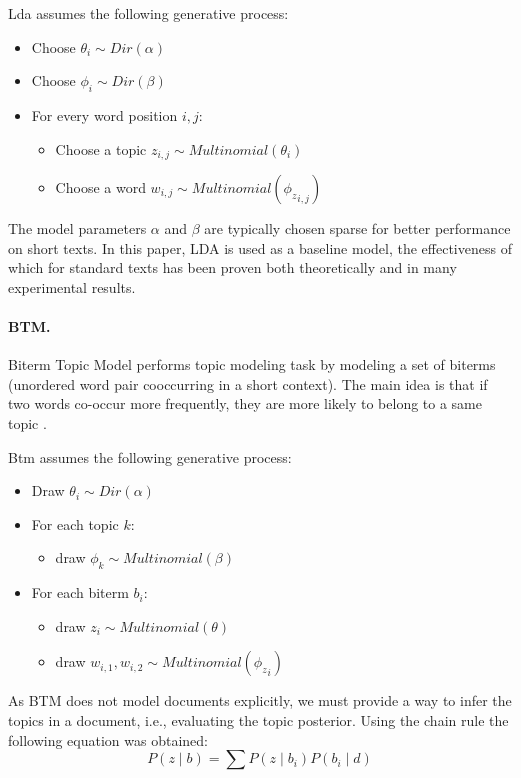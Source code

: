 Lda assumes the following generative process:
\begin{itemize}
	\item Choose \(\theta_i \sim \textit{Dir}(\alpha)\)
	\item Choose \(\phi_i \sim \textit{Dir}(\beta)\)
	\item For every word position \(i, j\):
	\begin{itemize}
		\item Choose a topic \(z_{i, j} \sim \textit{Multinomial}(\theta_i)\)
		\item Choose a word \(w_{i, j} \sim \textit{Multinomial}({\phi_z}_{i,j})\)
	\end{itemize}
\end{itemize}
The model parameters \(\alpha\) and \(\beta\) are typically chosen sparse for better performance on short texts. In this paper, LDA is used as a baseline model, the effectiveness of which for standard texts has been proven both theoretically and in many experimental results.

\paragraph{BTM.} Biterm Topic Model performs topic modeling task by modeling a set of biterms (unordered word pair cooccurring in a short context). The main idea is that if two words co-occur more frequently, they are more likely to belong to a same topic \cite{YanyanJiafengXueqi}.

Btm assumes the following generative process:
\begin{itemize}
	\item Draw \(\theta_i \sim \textit{Dir}(\alpha)\)
	\item For each topic \(k\):
	\begin{itemize}
		\item draw \(\phi_k \sim \textit{Multinomial}(\beta)\)
	\end{itemize}
	\item For each biterm \(b_i\):
	\begin{itemize}
		\item draw \(z_i \sim \textit{Multinomial}(\theta)\)
		\item draw \(w_{i,1},w_{i,2} \sim \textit{Multinomial}({\phi_z}_i)\)
	\end{itemize}
\end{itemize}

As BTM does not model documents explicitly, we must provide a way to infer the topics in a document, i.e., evaluating the topic posterior. Using the chain rule the following equation was obtained:
\begin{equation}
	\label{eqn:29}
	P(z \mid b) = \sum P(z \mid b_i) P(b_i \mid d)
\end{equation}

